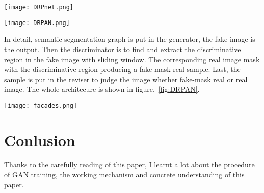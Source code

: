 \documentclass[10pt,twocolumn,letterpaper]{article}
\begin{document}
\begin{figure*}
\begin{center}
   \texttt{[image: DRPnet.png]}
\end{center}
   \caption{\textbf{Left}: Their Discriminative Region Proposal network (DRPnet). \textbf{Right}: Synthesized samples compared with previous works on Cityscapes validation dataset~\cite{Cordts2016The}. The regions within red window show obvious artifacts or deformation. Their method can synthesize images with clear structure and vivid details.~\cite{Wang2017Discriminative}}
\label{fig:DRPnet}
\end{figure*}

\begin{figure*}
\begin{center}
   \texttt{[image: DRPAN.png]}
\end{center}
   \caption{The overall network architecture and data flow of our proposed Discriminative Region Proposal Adversarial Network (DRPAN), which is composed of three components: a generator, a discriminator, and a reviser, and is a unified model for image-to-image translation tasks.~\cite{Wang2017Discriminative}}
\label{fig:DRPAN}
\end{figure*}

In detail, semantic segmentation graph is put in the generator, the fake image is the output. Then the discriminator is to find and extract the discriminative region in the fake image with sliding window. The corresponding real image mask with the discriminative region producing a fake-mask real sample. Last, the sample is put in the reviser to judge the image whether fake-mask real or real image. The whole architecure is shown in figure.~\ref{fig:DRPAN}.

\begin{figure*}
\begin{center}
   \texttt{[image: facades.png]}
\end{center}
   \caption{The training process of DRPAN on facades dataset~\cite{Radim2013Spatial}. Left: The plotting curve shows mean value of score map on synthesized samples. Right: Step by step synthesis on different discriminative regions.~\cite{Wang2017Discriminative}}
\label{fig:DRPAN}
\end{figure*}

\section{Conlusion}
Thanks to the carefully reading of this paper, I learnt a lot about the procedure of GAN training, the working mechanism and concrete understanding of this paper. 

{\small


}
\end{document}
